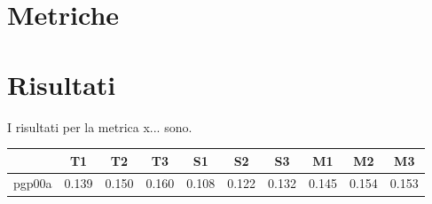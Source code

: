 \documentclass[12pt]{article}
\begin{document}
\section{Metriche}


\section{Risultati}
I risultati per la metrica x... sono.

\begin{table}[H]
	\centering
	\begin{tabular}{cccccccccc}
		       & \textbf{T1} & \textbf{T2} & \textbf{T3} & \textbf{S1} & \textbf{S2} & \textbf{S3} & \textbf{M1} & \textbf{M2} & \textbf{M3} \\ \hline
		pgp00a & 0.139       & 0.150       & 0.160       & 0.108       & 0.122       & 0.132       & 0.145       & 0.154       & 0.153       \\
	\end{tabular}
\end{table}
\end{document}

